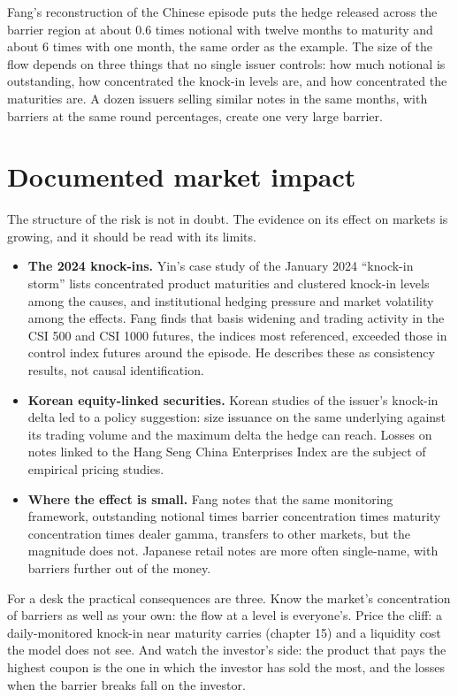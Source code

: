 Fang's reconstruction of the Chinese  episode puts the hedge released across the barrier region at about 0.6 times notional
with twelve months to maturity and about 6 times with one month, the same order as the example. The size of the flow depends on
three things that no single issuer controls: how much notional is outstanding, how concentrated the knock-in levels are, and how
concentrated the maturities are. A dozen issuers selling similar notes in the same months, with barriers at the same round
percentages, create one very large barrier.

\section{Documented market impact}

The structure of the risk is not in doubt. The evidence on its effect on markets is growing, and it should be read with its
limits.

\begin{itemize}
\item \textbf{The 2024  knock-ins.} Yin's case study of the January 2024 ``knock-in storm'' lists concentrated product
maturities and clustered knock-in levels among the causes, and institutional hedging pressure and market volatility among the
effects. Fang finds that basis widening and trading activity in the CSI 500 and CSI 1000 futures, the indices most 
referenced, exceeded those in control index futures around the episode. He describes these as consistency results, not causal
identification.
\item \textbf{Korean equity-linked securities.} Korean studies of the issuer's knock-in delta led to a policy suggestion: size
issuance on the same underlying against its trading volume and the maximum delta the hedge can reach. Losses on notes linked to the
Hang Seng China Enterprises Index are the subject of empirical pricing studies.
\item \textbf{Where the effect is small.} Fang notes that the same monitoring framework, outstanding notional times barrier
concentration times maturity concentration times dealer gamma, transfers to other markets, but the magnitude does not. Japanese
retail notes are more often single-name, with barriers further out of the money.
\end{itemize}

For a desk the practical consequences are three. Know the market's concentration of barriers as well as your own: the flow at a level
is everyone's. Price the cliff: a daily-monitored knock-in near maturity carries  (chapter 15) and a liquidity cost the model
does not see. And watch the investor's side: the product that pays the highest coupon is the one in which the investor has sold the
most, and the losses when the barrier breaks fall on the investor.

